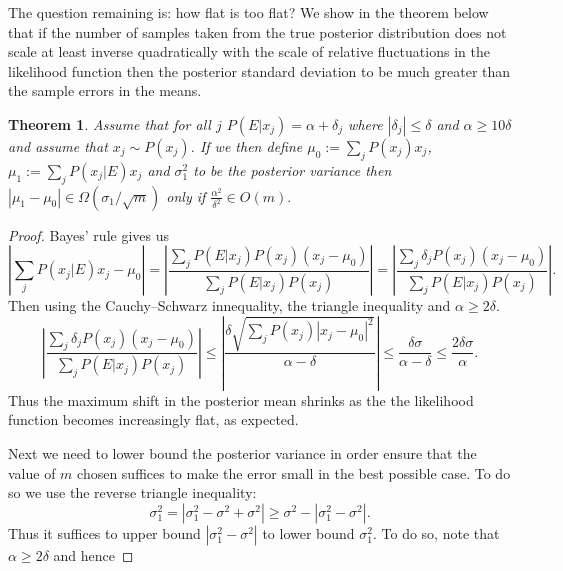 \documentclass[aps,pra,amsmath,twocolumn,amssymb,superscriptaddress]{revtex4-1}
\newtheorem{theorem}{Theorem}
\begin{document}
The question remaining is: how flat is too flat?  We show in the theorem below that if the number of samples taken from the true posterior distribution does not scale at least inverse quadratically with the scale of relative fluctuations in the likelihood function then the posterior standard deviation to be much greater than the sample errors in the means.  
\begin{theorem}
Assume that for all $j$ $P(E|x_j) =\alpha+\delta_j$ where $|\delta_j|\le \delta$ and $\alpha \ge 10\delta$ and assume that $x_j\sim P(x_j)$.  If we then define $\mu_0 := \sum_{j} P(x_j) x_j$, $\mu_1:= \sum_j P(x_j|E) x_j$ and $\sigma_1^2$ to be the posterior variance then $|\mu_1 - \mu_0| \in \Omega(\sigma_1/\sqrt{m})$ only if
$
\frac{\alpha^2}{\delta^2}\in O(m) .
$\label{thm:stability}
\end{theorem}
\begin{proof}
Bayes' rule gives us
\begin{equation}
\left|\sum_j P(x_j|E) x_j -\mu_0\right|= \left|\frac{\sum_j P(E|x_j)P(x_j) (x_j -\mu_0)}{\sum_j P(E|x_j)P(x_j)}\right|=\left|\frac{\sum_j \delta_j P(x_j)(x_j -\mu_0)}{\sum_j P(E|x_j)P(x_j)}\right|.\label{eq:A1}
\end{equation}
Then using the Cauchy--Schwarz innequality, the triangle inequality and $\alpha\ge 2\delta$.
\begin{equation}
\left|\frac{\sum_j \delta_jP(x_j )( x_j -\mu_0)}{\sum_j P(E|x_j)P(x_j)}\right| \le \left|\frac{\delta \sqrt{\sum_j P(x_j) |x_j -\mu_0|^2}}{\alpha-\delta}\right|\le \frac{\delta  \sigma}{\alpha-\delta}\le \frac{2\delta{\sigma}}{\alpha}.\label{eq:A2}
\end{equation}
Thus the maximum shift in the posterior mean shrinks as the the likelihood function becomes increasingly flat, as expected.

Next we need to lower bound the posterior variance in order ensure that the value of $m$ chosen suffices to make the error small in the best possible case.
To do so we use the reverse triangle inequality:
\begin{equation}
\sigma_1^2 = |\sigma_1^2 -\sigma^2 +\sigma^2| \ge \sigma^2 - |\sigma_1^2-\sigma^2|.
\end{equation}
Thus it suffices to upper bound $|\sigma_1^2-\sigma^2|$ to lower bound $\sigma_1^2$.  To do so, note that $\alpha \ge 2\delta$ and hence


\end{proof}
\end{document}
